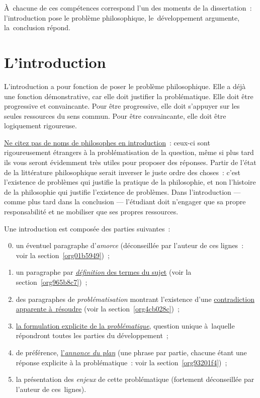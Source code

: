 \documentclass[a4paper,12pt]{report}
\begin{document}
À chacune de ces compétences correspond l'un des moments de la
dissertation : l'introduction pose le problème philosophique,
le développement argumente, la conclusion répond.


\chapter{L'introduction}
\label{sec:org6aeb955}
\label{org9a63b2a}

L'introduction a pour fonction de poser le problème philosophique. Elle
a déjà une fonction démonstrative, car elle doit justifier la
problématique. Elle doit être progressive et convaincante. Pour être
progressive, elle doit s'appuyer sur les seules ressources du sens
commun. Pour être convaincante, elle doit être logiquement rigoureuse.

\uline{Ne citez pas de noms de philosophes en introduction} : ceux-ci sont
rigoureusement étrangers à la problématisation de la question, même si
plus tard ils vous seront évidemment très utiles pour proposer des
réponses. Partir de l'état de la littérature philosophique serait
inverser le juste ordre des choses : c'est l'existence de problèmes qui
justifie la pratique de la philosophie, et non l'histoire de la
philosophie qui justifie l'existence de problèmes. Dans l'introduction
--- comme plus tard dans la conclusion --- l'étudiant doit n'engager que
sa propre responsabilité et ne mobiliser que ses propres ressources.

Une introduction est composée des parties suivantes :

\begin{enumerate}
\setcounter{enumi}{-1}
\item un éventuel paragraphe d'\emph{amorce} (déconseillée par l'auteur de
ces lignes : voir la section \ref{org01b5949}) ;

\item un paragraphe par \uline{\emph{définition} des termes du sujet} (voir la
section \ref{org965b8c7}) ;

\item des paragraphes de \emph{problématisation} montrant l'existence d'une
\uline{contradiction apparente à résoudre} (voir la
section \ref{org4cb028c}) ;

\item \uline{la formulation explicite de la \emph{problématique}}, question unique
à laquelle répondront toutes les parties du développement ;

\item de préférence, \uline{l'\emph{annonce du plan}} (une phrase par partie, chacune
étant une réponse explicite à la problématique : voir la
section \ref{org93201f4}) ;

\setcounter{enumi}{-1}
\item la présentation des \emph{enjeux} de cette problématique (fortement
déconseillée par l'auteur de ces lignes).
\end{enumerate}
\end{document}
